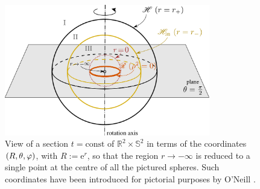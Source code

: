 \begin{figure}
\centerline{\includegraphics[width=0.8\textwidth]{ker_spher_view.pdf}}
\caption[]{\label{f:ker:spher_view} \footnotesize
View of a section $t=\mathrm{const}$ of $\mathbb{R}^2\times\mathbb{S}^2$
in terms of the coordinates $(R,\theta,\varphi)$, with $R:=\mathrm{e}^r$,
so that the region $r\rightarrow -\infty$
is reduced to a single point at the centre of all the pictured spheres.
Such coordinates have been introduced for pictorial purposes by O'Neill
\cite{ONeil95}.}
\end{figure}


